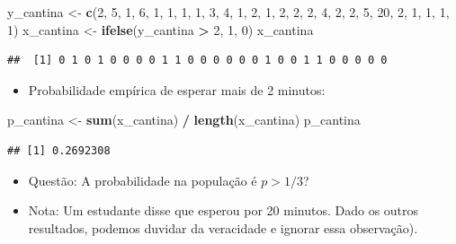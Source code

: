 \documentclass[]{article}
\newenvironment{Shaded}{\begin{snugshade}}{\end{snugshade}}
\newcommand{\KeywordTok}[1]{\textcolor[rgb]{0.13,0.29,0.53}{\textbf{#1}}}
\newcommand{\DecValTok}[1]{\textcolor[rgb]{0.00,0.00,0.81}{#1}}
\newcommand{\StringTok}[1]{\textcolor[rgb]{0.31,0.60,0.02}{#1}}
\newcommand{\OperatorTok}[1]{\textcolor[rgb]{0.81,0.36,0.00}{\textbf{#1}}}
\newcommand{\NormalTok}[1]{#1}
\providecommand{\tightlist}{%
  \setlength{\itemsep}{0pt}\setlength{\parskip}{0pt}}
\begin{document}
\begin{Shaded}
\begin{Highlighting}[]
\NormalTok{y_cantina <-}\StringTok{ }\KeywordTok{c}\NormalTok{(}\DecValTok{2}\NormalTok{, }\DecValTok{5}\NormalTok{, }\DecValTok{1}\NormalTok{, }\DecValTok{6}\NormalTok{, }\DecValTok{1}\NormalTok{, }\DecValTok{1}\NormalTok{, }\DecValTok{1}\NormalTok{, }\DecValTok{1}\NormalTok{, }\DecValTok{3}\NormalTok{, }\DecValTok{4}\NormalTok{, }\DecValTok{1}\NormalTok{, }\DecValTok{2}\NormalTok{, }\DecValTok{1}\NormalTok{, }\DecValTok{2}\NormalTok{, }\DecValTok{2}\NormalTok{, }\DecValTok{2}\NormalTok{, }\DecValTok{4}\NormalTok{, }\DecValTok{2}\NormalTok{, }\DecValTok{2}\NormalTok{, }\DecValTok{5}\NormalTok{, }\DecValTok{20}\NormalTok{, }\DecValTok{2}\NormalTok{, }\DecValTok{1}\NormalTok{, }\DecValTok{1}\NormalTok{, }\DecValTok{1}\NormalTok{, }\DecValTok{1}\NormalTok{)}
\NormalTok{x_cantina <-}\StringTok{ }\KeywordTok{ifelse}\NormalTok{(y_cantina }\OperatorTok{>}\StringTok{ }\DecValTok{2}\NormalTok{, }\DecValTok{1}\NormalTok{, }\DecValTok{0}\NormalTok{)}
\NormalTok{x_cantina}
\end{Highlighting}
\end{Shaded}

\begin{verbatim}
##  [1] 0 1 0 1 0 0 0 0 1 1 0 0 0 0 0 0 1 0 0 1 1 0 0 0 0 0
\end{verbatim}

\begin{itemize}
\tightlist
\item
  Probabilidade empírica de esperar mais de 2 minutos:
\end{itemize}

\begin{Shaded}
\begin{Highlighting}[]
\NormalTok{p_cantina <-}\StringTok{ }\KeywordTok{sum}\NormalTok{(x_cantina) }\OperatorTok{/}\StringTok{ }\KeywordTok{length}\NormalTok{(x_cantina)}
\NormalTok{p_cantina}
\end{Highlighting}
\end{Shaded}

\begin{verbatim}
## [1] 0.2692308
\end{verbatim}

\begin{itemize}
\tightlist
\item
  Questão: A probabilidade na população é \(p > 1/3\)?
\item
  Nota: Um estudante disse que esperou por 20 minutos. Dado os outros
  resultados, podemos duvidar da veracidade e ignorar essa observação).
\end{itemize}
\end{document}
